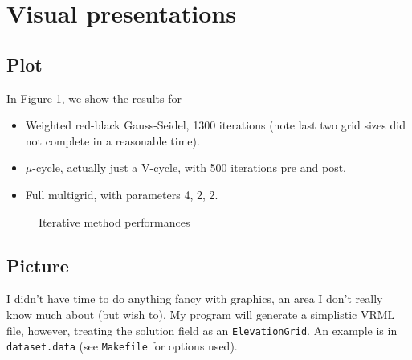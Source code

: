 \documentclass[titlepage,twoside]{article}
\begin{document}
\section{Visual presentations}
\label{sec:visual}


\subsection{Plot}
\label{sec:plot}

In Figure \ref{all three}, we show the results for
\begin{itemize}
\item Weighted red-black Gauss-Seidel, 1300 iterations (note last two
  grid sizes did not complete in a reasonable time).
\item $\mu$-cycle, actually just a V-cycle, with 500 iterations pre and
  post.
\item Full multigrid, with parameters 4, 2, 2.
\end{itemize}

\begin{figure}
  \begin{center}
    
    \label{fig:all-three}
  \end{center}
  \caption{\label{all three}Iterative method performances}
\end{figure}




\subsection{Picture}
\label{sec:picture}

I didn't have time to do anything fancy with graphics, an area I don't
really know much about (but wish to).  My program will generate a
simplistic VRML file, however, treating the solution field as an
\texttt{ElevationGrid}.  An example is in \texttt{dataset.data} (see
\texttt{Makefile} for options used).
\end{document}
